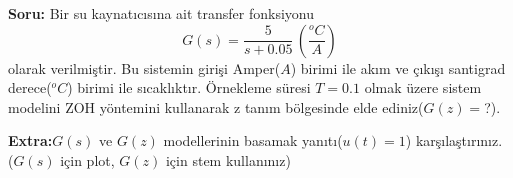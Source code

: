 \noindent\textbf{Soru:} Bir su kaynatıcısına ait transfer fonksiyonu
\begin{equation}
    G(s)=\frac{5}{s+0.05}\,\left(\frac{^oC}{A}\right)
\end{equation}
olarak verilmiştir. Bu sistemin girişi Amper($A$) birimi ile akım ve çıkışı santigrad derece($^oC$) birimi ile sıcaklıktır. Örnekleme süresi $T=0.1$ olmak üzere sistem modelini ZOH yöntemini kullanarak z tanım bölgesinde elde ediniz($G(z)=$?).

\noindent\textbf{Extra:}$G(s)$ ve $G(z)$ modellerinin basamak yanıtı($u(t)=1$) karşılaştırınız. ($G(s)$ için plot, $G(z)$ için stem kullanınız)
